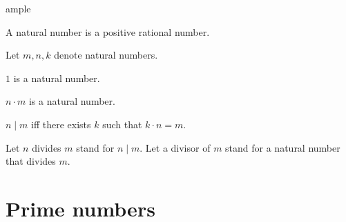 ample\documentclass[english]{article}
\begin{document}
  \begin{forthel}
    \begin{signature}
      A natural number is a positive rational number.
    \end{signature}

    Let $m, n, k$ denote natural numbers.

    \begin{signature}
        $1$ is a natural number.
    \end{signature}

    \begin{axiom}
      $n \cdot m$ is a natural number.
    \end{axiom}

    \begin{definition}
      $n \mid m$ iff there exists $k$ such that $k \cdot n = m$.
    \end{definition}

    Let $n$ divides $m$ stand for $n \mid m$.
    Let a divisor of $m$ stand for a natural number that divides $m$.
  \end{forthel}

  \section*{Prime numbers}
\end{document}
